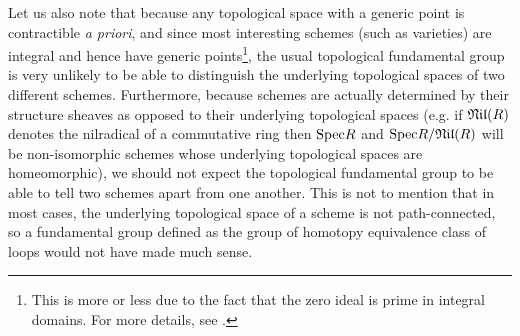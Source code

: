                 Let us also note that because any topological space with a generic point is contractible \textit{a priori}, and since most interesting schemes (such as varieties) are integral and hence have generic points\footnote{This is more or less due to the fact that the zero ideal is prime in integral domains. For more details, see \cite[\href{https://stacks.math.columbia.edu/tag/01IS}{Tag 01IS}]{stacks-project}.}, the usual topological fundamental group is very unlikely to be able to distinguish the underlying topological spaces of two different schemes. Furthermore, because schemes are actually determined by their structure sheaves as opposed to their underlying topological spaces (e.g. if $\mathfrak{Nil}(R)$ denotes the nilradical of a commutative ring then $\mathrm{Spec} R$ and $\mathrm{Spec} R/\mathfrak{Nil}(R)$ will be non-isomorphic schemes whose underlying topological spaces are homeomorphic), we should not expect the topological fundamental group to be able to tell two schemes apart from one another. This is not to mention that in most cases, the underlying topological space of a scheme is not path-connected, so a fundamental group defined as the group of homotopy equivalence class of loops would not have made much sense.
